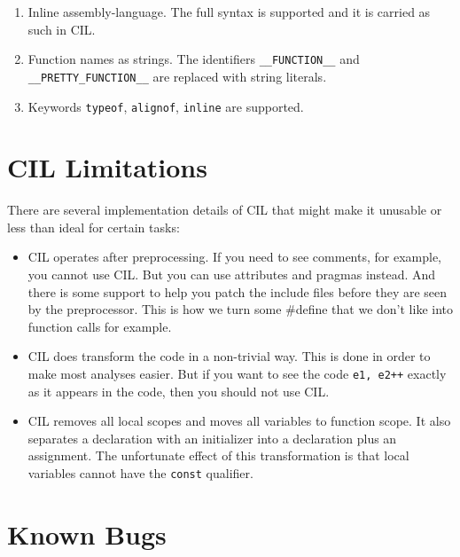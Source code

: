 \documentclass{article}
\def\t#1{{\tt #1}}
\begin{document}
\begin{enumerate}
\item Inline assembly-language. The full syntax is supported and it is carried
as such in CIL.

\item Function names as strings. The identifiers \t{\_\_FUNCTION\_\_} and
\t{\_\_PRETTY\_FUNCTION\_\_} are replaced with string literals. 

\item Keywords \t{typeof}, \t{alignof}, \t{inline} are supported. 
\end{enumerate}

\section{CIL Limitations}

 There are several implementation details of CIL that might make it unusable
 or less than ideal for certain tasks:

\begin{itemize}
\item CIL operates after preprocessing. If you need to see comments, for
example, you cannot use CIL. But you can use attributes and pragmas instead.
And there is some support to help you patch the include files before they are
seen by the preprocessor. This is how we turn some #define that we don't like
into function calls for example. 

\item CIL does transform the code in a non-trivial way. This is done in order
to make most analyses easier. But if you want to see the code \t{e1, e2++}
exactly as it appears in the code, then you should not use CIL. 

\item CIL removes all local scopes and moves all variables to function
scope. It also separates a declaration with an initializer into a declaration
plus an assignment. The unfortunate effect of this transformation is that
local variables cannot have the \t{const} qualifier.

\end{itemize}
 
\section{Known Bugs}
\end{document}
